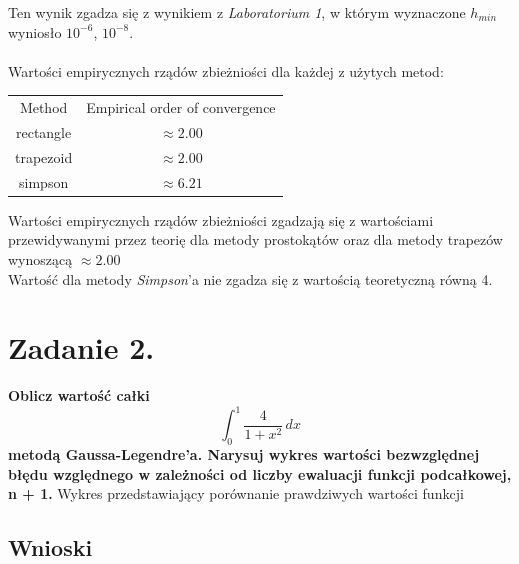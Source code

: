 \documentclass{article}
\begin{document}
Ten wynik zgadza się z wynikiem z \textit{Laboratorium 1}, w którym
wyznaczone $h_{min}$ wyniosło $10^{-6}$, $10^{-8}$. \\\\
\null\quad
Wartości empirycznych rządów zbieżniości dla każdej z
użytych metod:
\begin{center}
  \begin{tabular}{c c} 
   Method & Empirical order of convergence\\
   rectangle & $\approx 2.00$\\
   trapezoid & $\approx 2.00$\\
   simpson & $\approx 6.21$
  \end{tabular}
\end{center}
\null\quad
Wartości empirycznych rządów zbieżniości zgadzają się z
wartościami przewidywanymi przez teorię dla metody prostokątów oraz
dla metody trapezów wynoszącą $\approx 2.00$\\
Wartość dla metody \textit{Simpson}'a nie zgadza się z
wartością teoretyczną równą 4.

\section*{Zadanie 2.}
\textbf{Oblicz wartość całki $$ \int_{0}^{1} \frac{4}{1+x^2} \,dx $$
metodą Gaussa-Legendre’a. Narysuj wykres wartości bezwzględnej
błędu względnego w zależności od liczby ewaluacji funkcji
podcałkowej, n + 1.}
\newpage
Wykres przedstawiający porównanie prawdziwych wartości funkcji 


\subsection*{Wnioski}
\null\quad 
\end{document}

